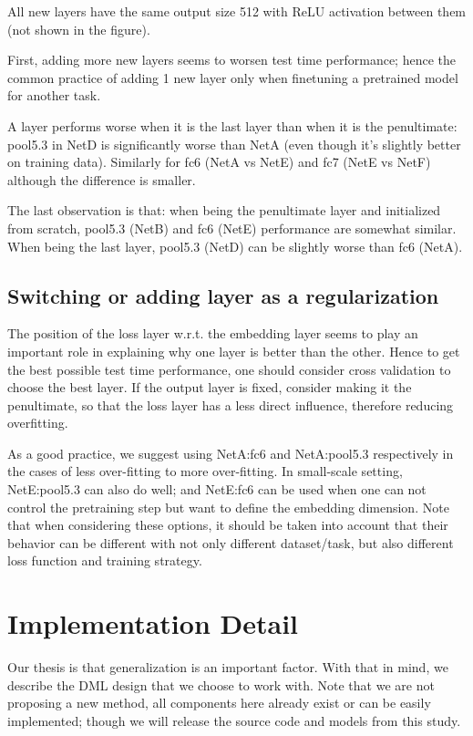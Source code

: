 \documentclass[10pt,twocolumn,letterpaper]{article}
\begin{document}
All new layers have the same output size 512 with ReLU activation between them (not shown in the figure).

First, adding more new layers seems to worsen test time performance; hence the common practice of adding 1 new layer only when finetuning a pretrained model for another task.

A layer performs worse when it is the last layer than when it is the penultimate: pool5.3 in NetD is significantly worse than NetA (even though it's slightly better on training data). Similarly for fc6 (NetA vs NetE) and fc7 (NetE vs NetF) although the difference is smaller.

The last observation is that: when being the penultimate layer and initialized from scratch, pool5.3 (NetB) and fc6 (NetE) performance are somewhat similar. When being the last layer, pool5.3 (NetD) can be slightly worse than fc6 (NetA).


\subsection{Switching or adding layer as a regularization}


The position of the loss layer w.r.t. the embedding layer seems to play an important role in explaining why one layer is better than the other. Hence to get the best possible test time performance, one should consider cross validation to choose the best layer. If the output layer is fixed, consider making it the penultimate, so that the loss layer has a less direct influence, therefore reducing overfitting.

As a good practice, we suggest using NetA:fc6 and NetA:pool5.3 respectively in the cases of less over-fitting to more over-fitting. In small-scale setting, NetE:pool5.3 can also do well; and NetE:fc6 can be used when one can not control the pretraining step but want to define the embedding dimension. Note that when considering these options, it should be taken into account that their behavior can be different with not only different dataset/task, but also different loss function and training strategy.



\section{Implementation Detail}


Our thesis is that generalization is an important factor. With that in mind, we describe the DML design that we choose to work with. Note that we are not proposing a new method, all components here already exist or can be easily implemented; though we will release the source code and models from this study. 
\end{document}
